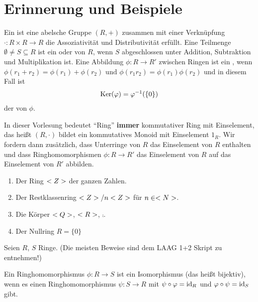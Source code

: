 \section{Erinnerung und Beispiele}

\begin{erinnerung}
	Ein  ist eine abelsche Gruppe $(R,+)$ zusammen mit einer Verknüpfung $\cdot : R\times R \to R$ die Assoziativität und Distributivität erfüllt. Eine Teilmenge $\emptyset \neq S \subseteq R$ ist ein  oder  von $R$, wenn $S$ abgeschlossen unter Addition, Subtraktion und Multiplikation ist. Eine Abbildung $\phi : R \to R'$ zwischen Ringen ist ein , wenn $\phi(r_1 + r_2) = \phi(r_1) + \phi(r_2) \text{ und } \phi(r_1 r_2) = \phi(r_1) \phi(r_2)$ und in diesem Fall ist
	\begin{align}
		\operatorname{Ker}(\varphi)=\varphi^{-1}(\{0\}) \notag
	\end{align}
	der  von $\phi$.
\end{erinnerung}

\begin{remark}
	In dieser Vorlesung bedeutet ``Ring'' \textbf{immer} kommutativer Ring mit Einselement, das heißt $(R,\cdot)$ bildet ein kommutatives Monoid mit Einselement $1_R$. Wir fordern dann zusätzlich, dass Unterringe von $R$ das Einselement von $R$ enthalten und dass Ringhomomorphismen $\phi : R \to R'$ das Einselement von $R$ auf das Einselement von $R'$ abbilden.
\end{remark}

\begin{example}
	\begin{enumerate}[label=(\alph*)]
		\item Der Ring $<Z>$ der ganzen Zahlen.
		\item Der Restklassenring $<Z> / n <Z>$ für $n \in <N>$.
		\item Die Körper $<Q>$, $<R>$, $\comp$.
		\item Der Nullring $R = \{0\}$
	\end{enumerate}
\end{example}

Seien $R$, $S$ Ringe. (Die meisten Beweise sind dem LAAG 1+2 Skript zu entnehmen!)

\begin{proposition}
	Ein Ringhomomorphismus $\phi: R \to S$ ist ein Isomorphismus (das heißt bijektiv), wenn es einen Ringhomomorphismus $\psi: S \to R$ mit $\psi \circ \varphi = \operatorname{id}_R$ und $\varphi \circ \psi = \operatorname{id}_{S}$ gibt.
\end{proposition}

